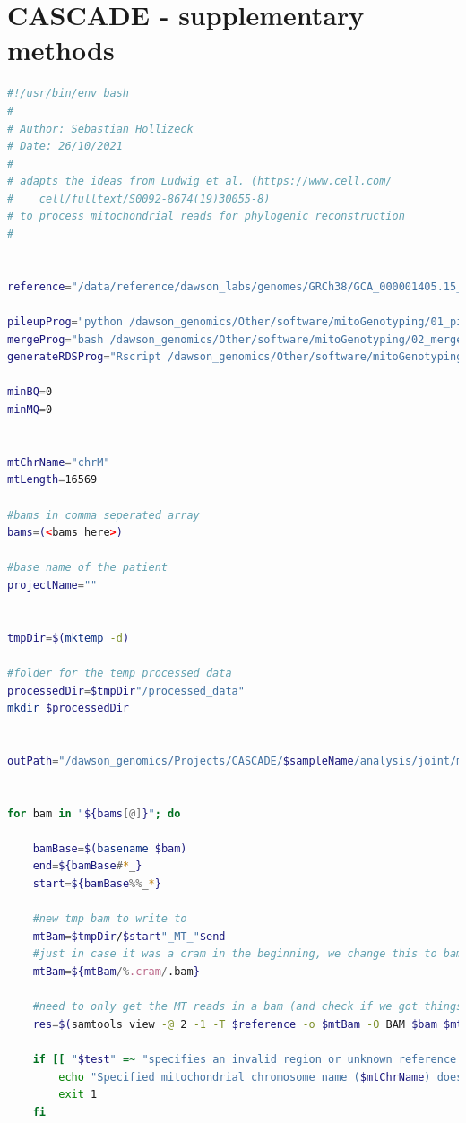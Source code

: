 \chapter{CASCADE - supplementary methods}
\label{ch-cascadeSuppMeth}


\begin{lstlisting}[language=bash, caption=Preprocessing of mitochondrial reads and variants for analysis in R, label={lst-cascadeAppendix:mitoPreProcessing}]
#!/usr/bin/env bash
#
# Author: Sebastian Hollizeck
# Date: 26/10/2021
#
# adapts the ideas from Ludwig et al. (https://www.cell.com/
#    cell/fulltext/S0092-8674(19)30055-8)
# to process mitochondrial reads for phylogenic reconstruction
#


reference="/data/reference/dawson_labs/genomes/GRCh38/GCA_000001405.15_GRCh38_full_analysis_set.fna"

pileupProg="python /dawson_genomics/Other/software/mitoGenotyping/01_pileup_counts.py"
mergeProg="bash /dawson_genomics/Other/software/mitoGenotyping/02_merge_pileup_counts.sh"
generateRDSProg="Rscript /dawson_genomics/Other/software/mitoGenotyping/03_makeRDS.R"

minBQ=0
minMQ=0


mtChrName="chrM"
mtLength=16569

#bams in comma seperated array
bams=(<bams here>)

#base name of the patient
projectName=""


tmpDir=$(mktemp -d)

#folder for the temp processed data
processedDir=$tmpDir"/processed_data"
mkdir $processedDir


outPath="/dawson_genomics/Projects/CASCADE/$sampleName/analysis/joint/mito"


for bam in "${bams[@]}"; do

    bamBase=$(basename $bam)
    end=${bamBase#*_}
    start=${bamBase%%_*}

    #new tmp bam to write to
    mtBam=$tmpDir/$start"_MT_"$end
    #just in case it was a cram in the beginning, we change this to bam
    mtBam=${mtBam/%.cram/.bam}

    #need to only get the MT reads in a bam (and check if we got things)
    res=$(samtools view -@ 2 -1 -T $reference -o $mtBam -O BAM $bam $mtChrName --write-index 2>&1)

    if [[ "$test" =~ "specifies an invalid region or unknown reference. Continue anyway." ]]; then
        echo "Specified mitochondrial chromosome name ($mtChrName) does not exist in bam ($bam)"
        exit 1
    fi


\end{lstlisting}
